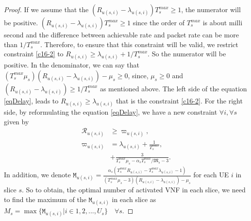 \documentclass[lettersize,journal]{IEEEtran}
\begin{document}
\begin{proof}
If we assume that the $(R_{u(s,i)}-\lambda_{u(s,i)})T^{max}_s \geq 1$, the numerator will be positive.
$(R_{u(s,i)}-\lambda_{u(s,i)})T^{max}_s \geq 1$ since the order of $T^{max}_s$ is about milli second and the difference between achievable rate and packet rate can be more than $1/T^{max}_s$.
Therefore, to ensure that this constraint will be valid, we restrict constraint \eqref{c16-2} to $R_{u(s,i)} \geq \lambda_{u(s,i)} + 1/T^{max}_s$.
So the numerator will be positive.
In the denominator, we can say that $(T^{max}_s\mu_s)(R_{u(s,i)}-\lambda_{u(s,i)}) - \mu_s \geq 0 $, since,
$\mu_s \geq 0$ and
$(R_{u(s,i)}-\lambda_{u(s,i)}) \geq 1/T^{max}_s$ as mentioned above.
The left side of the equation \eqref{eqDelay}, leads to $R_{u(s,i)} \geq \lambda_{u(s,i)}$ that is the constraint \eqref{c16-2}.
For the right side, by reformulating the equation \eqref{eqDelay}, we have a new constraint $\forall i, \forall s$ given by
\begin{subequations}\label{RM}
\begin{alignat}{4}
\mathcal{R}_{u(s,i)} &\geq \varpi_{u(s,i)}, \\
\varpi_{u(s,i)} &= \lambda_{u(s,i)} + \frac{1}{T^{max}_s},\\
& + \frac{3}{T^{max}_s\mu_s-\alpha_s T^{max}_s/\mathfrak{M}_s-3}.
\end{alignat}
\end{subequations}
In addition, we denote $\mathtt{M}_{u(s,i)} = \frac{\alpha_s(T^{max}_s R_{u(s,i)}-T^{max}_s\lambda_{u(s,i)} -1)}{(T^{max}_s\mu_s-3)(R_{u(s,i)}-\lambda_{u(s,i)}) - \mu_s }$ for each UE $i$ in slice $s$.
So to obtain, the optimal number of activated VNF in each slice, we need to find the maximum of the
$\mathtt{M}_{u(s,i)}$ in each slice as $M_s = \max\{\mathtt{M}_{u(s,i)} | i \in 1,2,..., U_s\} \quad \forall s $.
\end{proof}
\end{document}
